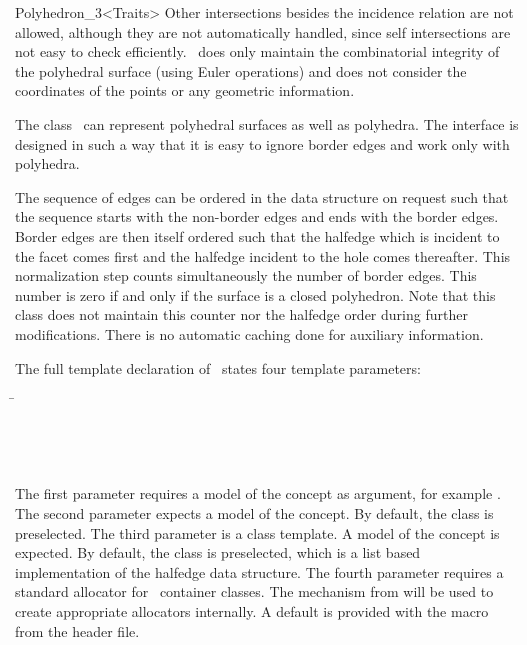\begin{ccRefClass}{Polyhedron_3<Traits>}
Other intersections besides the incidence relation are not allowed,
although they are not automatically handled, since self intersections
are not easy to check efficiently. \ccClassTemplateName\ does only
maintain the combinatorial integrity of the polyhedral surface (using
Euler operations) and does not consider the coordinates of the points
or any geometric information.

The class \ccClassTemplateName\ can represent polyhedral surfaces as
well as polyhedra. The interface is designed in such a way that it
is easy to ignore border edges and work only with polyhedra.

The sequence of edges can be ordered in the data structure on request
such that the sequence starts with the non-border edges and ends with
the border edges. Border edges are then itself ordered such that the
halfedge which is incident to the facet comes first and the halfedge
incident to the hole comes thereafter. This normalization step counts
simultaneously the number of border edges. This number is zero if and
only if the surface is a closed polyhedron. Note that this class does
not maintain this counter nor the halfedge order during further
modifications. There is no automatic caching done for auxiliary
information.


\ccParameters

The full template declaration of \ccClassTemplateName\ states four
template parameters:

\begin{tabbing}
 \=\\
                 \>\\
                 \>
                 \\
                 \>\\
\end{tabbing}
   
The first parameter requires a model of the 
concept as argument, for example .  The
second parameter expects a model of the 
concept.  By default, the class  is
preselected. The third parameter is a class template. A model of the
 concept is expected. By default, the class
 is preselected, which is a list based
implementation of the halfedge data structure.
The fourth parameter  requires a standard allocator for 
\stl\ container classes. The   mechanism from 
will be used to create appropriate allocators internally. A default is
provided with the macro  from the
 header file.


\end{ccRefClass}
